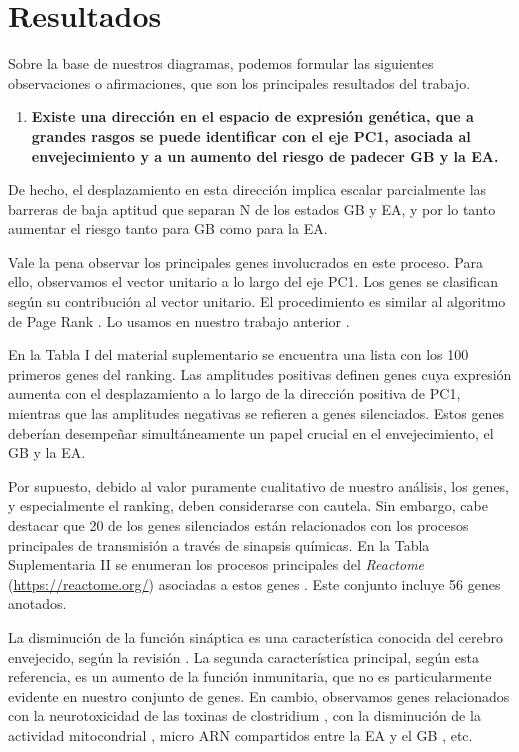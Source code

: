 \chapter{Resultados}
\label{cap3}
\onehalfspacing

Sobre la base de nuestros diagramas, podemos formular las siguientes observaciones o afirmaciones, que son los principales resultados del trabajo.

\begin{enumerate}
	\item  \textbf{Existe una dirección en el espacio de expresión genética, que a grandes rasgos se puede identificar con el eje PC1, asociada al envejecimiento y a un aumento del riesgo de padecer GB y la EA.}
\end{enumerate}

De hecho, el desplazamiento en esta dirección implica escalar parcialmente las barreras de baja aptitud que separan N de los estados GB y EA, y por lo tanto aumentar el riesgo tanto para GB como para la EA.

Vale la pena observar los principales genes involucrados en este proceso. Para ello, observamos el vector unitario a lo largo del eje PC1. Los genes se clasifican según su contribución al vector unitario. \alert{El procedimiento es similar al algoritmo de Page Rank \cite{Duhan_2009}. Lo usamos en nuestro trabajo anterior \cite{Gonzalez_2023}.}

\alert{En la Tabla I del material suplementario} se encuentra una lista con los 100 primeros genes del ranking. Las amplitudes positivas definen genes cuya expresión aumenta con el desplazamiento a lo largo de la dirección positiva de PC1, mientras que las amplitudes negativas se refieren a genes silenciados. Estos genes deberían desempeñar simultáneamente un papel crucial en el envejecimiento, el GB y la EA.

Por supuesto, debido al valor puramente cualitativo de nuestro análisis, los genes, y especialmente el ranking, deben considerarse con cautela. Sin embargo, cabe destacar que 20 de los genes silenciados están relacionados con los procesos principales de transmisión a través de sinapsis químicas. \alert{En la Tabla Suplementaria II} se enumeran los procesos principales del \textit{Reactome} (\href{https://reactome.org/}{https://reactome.org/}) asociadas a estos genes \cite{Gillespie_2021}. Este conjunto incluye 56 genes anotados.

La disminución de la función sináptica es una característica conocida del cerebro envejecido, según la revisión \cite{Ham_2020}. La segunda característica principal, según esta referencia, es un aumento de la función inmunitaria, que no es particularmente evidente en nuestro conjunto de genes. En cambio, observamos genes relacionados con la neurotoxicidad de las toxinas de clostridium \cite{Biazzo_2022}, con la disminución de la actividad mitocondrial \cite{Sun_2016}, micro ARN compartidos entre la EA y el GB \cite{Thomas_2020}, etc.

